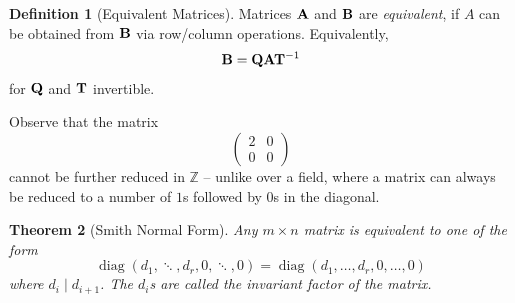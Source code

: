 \documentclass{article}
\newtheorem{theorem}{Theorem}[section]
\theoremstyle{definition}
\newtheorem{definition}[theorem]{Definition}
\theoremstyle{remark}
\newcommand{\pqty}[1]{\left(#1\right)}
\newcommand{\pmqty}[1]{\begin{pmatrix}#1\end{pmatrix}}
\newcommand{\inverse}{^{-1}}
\newcommand{\divides}{\mid}
\newcommand{\ZZ}{\mathbb{Z}}
\newcommand{\diag}{\operatorname{diag}}
\begin{document}
\begin{definition}[Equivalent Matrices]
    \label{def:equivalent-matrix}%
    Matrices \(\vb{A}\) and \(\vb{B}\) are \emph{equivalent}, if \(A\) can be obtained from \(\vb{B}\) via row/column operations. Equivalently,
    \[
        \vb{B} = \vb{Q} \vb{A} \vb{T}\inverse
    \]
    for \(\vb{Q}\) and \(\vb{T}\) invertible.
\end{definition}

Observe that the matrix
\[
    \pmqty{
        2 & 0 \\ 0 & 0
    }
\]
cannot be further reduced in \(\ZZ\) -- unlike over a field, where a matrix can always be reduced to a number of \(1\)s followed by \(0\)s in the diagonal.

\begin{theorem}[Smith Normal Form]
    \label{thm:smith-normal-form}%
    Any \(m \times n\) matrix is equivalent to one of the form
    \[
        \operatorname{diag}\pqty{d_1, \ddots, d_r, 0, \ddots, 0} = \diag\pqty{d_1, \ldots, d_r, 0, \ldots, 0}
    \]
    where \(d_i \divides d_{i + 1}\). The \(d_i\)s are called the \emph{invariant factor} of the matrix.
\end{theorem}
\end{document}
